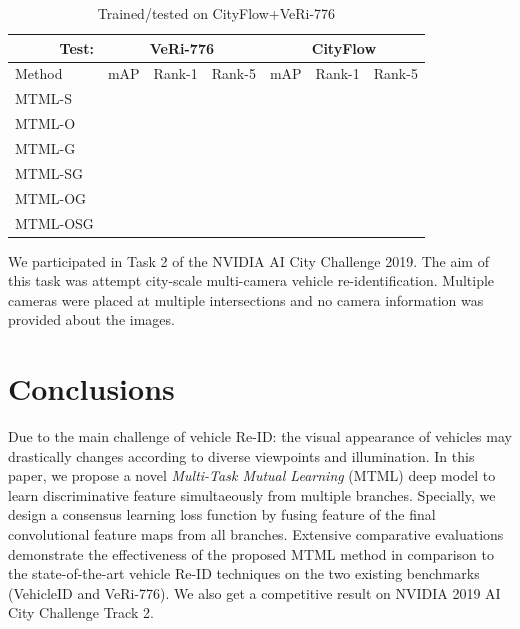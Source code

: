 \documentclass[10pt,twocolumn,letterpaper]{article}
\begin{document}
\begin{table}[ht]
  \centering
  \setlength{\tabcolsep}{0.01cm}
  \begin{tabular}{l|c|c|c|c|c|c}
  \hline
  \multicolumn{1}{r|}{Test:} & \multicolumn{3}{c|}{VeRi-776} & \multicolumn{3}{c}{CityFlow} \\
  \hline
  Method       & mAP    & Rank-1   & Rank-5   & mAP    & Rank-1   & Rank-5   \\
  \hline
  MTML-S       &        &          &          &        &          &          \\
  MTML-O       &        &          &          &        &          &          \\
  MTML-G       &        &          &          &        &          &          \\
  MTML-SG      &        &          &          &        &          &          \\
  MTML-OG      &        &          &          &        &          &          \\
  MTML-OSG     &        &          &          &        &          &      \\
  \hline
  \end{tabular}
  \caption{Trained/tested on CityFlow+VeRi-776}
  \label{T:cf_veri_res}
\end{table}

We participated in Task 2 of the NVIDIA AI City Challenge 2019. The aim of this task was attempt city-scale multi-camera vehicle re-identification. Multiple cameras were placed at multiple intersections and no camera information was provided about the images.

%

\section{Conclusions}
Due to the main challenge of vehicle Re-ID: the visual appearance of vehicles may drastically changes
according to diverse viewpoints and illumination.
%
In this paper, we propose a novel {\em Multi-Task Mutual Learning} (MTML) deep model
to learn discriminative feature simultaeously from multiple branches.
%
Specially, we design a consensus learning loss function by fusing feature of the final convolutional feature maps from all branches.
%
Extensive comparative evaluations demonstrate the effectiveness of the
proposed MTML method in comparison to the state-of-the-art vehicle Re-ID techniques on the two existing benchmarks
(VehicleID and VeRi-776).
We also get a competitive result on NVIDIA 2019 AI City Challenge Track 2.

{\small


}
\end{document}
